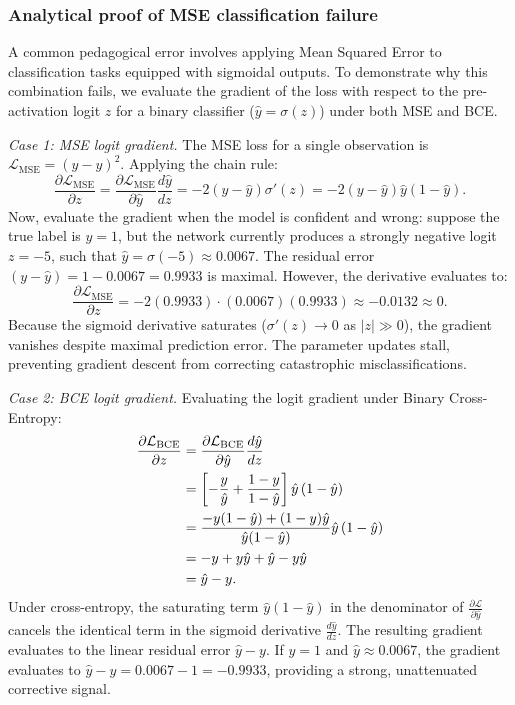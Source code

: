 \documentclass[../../main.tex]{subfiles}
\begin{document}
\subsubsection{Analytical proof of MSE classification failure}

A common pedagogical error involves applying Mean Squared Error to classification tasks equipped with sigmoidal outputs. To demonstrate why this combination fails, we evaluate the gradient of the loss with respect to the pre-activation logit $z$ for a binary classifier ($\hat{y} = \sigma(z)$) under both MSE and BCE.

\textit{Case 1: MSE logit gradient.} The MSE loss for a single observation is $\mathcal{L}_{\text{MSE}} = (y - \hat{y})^2$. Applying the chain rule:
\begin{equation}
\frac{\partial \mathcal{L}_{\text{MSE}}}{\partial z} = \frac{\partial \mathcal{L}_{\text{MSE}}}{\partial \hat{y}} \frac{d\hat{y}}{dz} = -2\left(y - \hat{y}\right) \sigma'(z) = -2\left(y - \hat{y}\right) \hat{y}\left(1 - \hat{y}\right).
\end{equation}
Now, evaluate the gradient when the model is confident and wrong: suppose the true label is $y = 1$, but the network currently produces a strongly negative logit $z = -5$, such that $\hat{y} = \sigma(-5) \approx 0.0067$. The residual error $(y - \hat{y}) = 1 - 0.0067 = 0.9933$ is maximal. However, the derivative evaluates to:
\begin{equation}
\frac{\partial \mathcal{L}_{\text{MSE}}}{\partial z} = -2(0.9933) \cdot (0.0067)(0.9933) \approx -0.0132 \approx 0.
\end{equation}
Because the sigmoid derivative saturates ($\sigma'(z) \to 0$ as $|z| \gg 0$), the gradient vanishes despite maximal prediction error. The parameter updates stall, preventing gradient descent from correcting catastrophic misclassifications.

\textit{Case 2: BCE logit gradient.} Evaluating the logit gradient under Binary Cross-Entropy:
\begin{align}
\frac{\partial \mathcal{L}_{\text{BCE}}}{\partial z} &= \frac{\partial \mathcal{L}_{\text{BCE}}}{\partial \hat{y}} \frac{d\hat{y}}{dz} \notag \\
&= \left[ -\frac{y}{\hat{y}} + \frac{1 - y}{1 - \hat{y}} \right] \hat{y}\left(1 - \hat{y}\right) \notag \\
&= \frac{-y(1 - \hat{y}) + (1 - y)\hat{y}}{\hat{y}(1 - \hat{y})} \hat{y}\left(1 - \hat{y}\right) \notag \\
&= -y + y\hat{y} + \hat{y} - y\hat{y} \notag \\
&= \hat{y} - y.
\label{eq:bce_gradient_collapse}
\end{align}
Under cross-entropy, the saturating term $\hat{y}(1 - \hat{y})$ in the denominator of $\frac{\partial \mathcal{L}}{\partial \hat{y}}$ cancels the identical term in the sigmoid derivative $\frac{d\hat{y}}{dz}$. The resulting gradient evaluates to the linear residual error $\hat{y} - y$. If $y = 1$ and $\hat{y} \approx 0.0067$, the gradient evaluates to $\hat{y} - y = 0.0067 - 1 = -0.9933$, providing a strong, unattenuated corrective signal.
\end{document}
